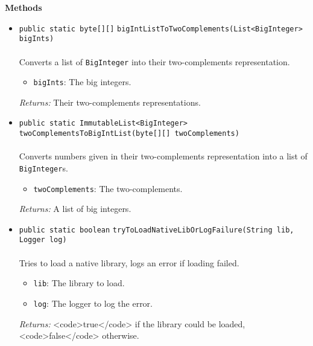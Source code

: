 \textbf{\sffamily Methods}
\begin{itemize}
\item \lstinline|public static byte[][]| \lstinline|bigIntListToTwoComplements|\lstinline|(List<BigInteger> bigInts)|\\ \\[-0.6em]
Converts a list of \lstinline|BigInteger| into their two-complements representation.
\begin{itemize}
\item \lstinline|bigInts|: The big integers.
\end{itemize}

\emph{Returns:} Their two-complements representations.

\item \lstinline|public static ImmutableList<BigInteger>| \lstinline|twoComplementsToBigIntList|\lstinline|(byte[][] twoComplements)|\\ \\[-0.6em]
Converts numbers given in their two-complements representation  into a list of
 \lstinline|BigInteger|s.
\begin{itemize}
\item \lstinline|twoComplements|: The two-complements.
\end{itemize}

\emph{Returns:} A list of big integers.

\item \lstinline|public static boolean| \lstinline|tryToLoadNativeLibOrLogFailure|\lstinline|(String lib, Logger log)|\\ \\[-0.6em]
Tries to load a native library, logs an error if loading failed.
\begin{itemize}
\item \lstinline|lib|: The library to load.
\item \lstinline|log|: The logger to log the error.
\end{itemize}

\emph{Returns:} <code>true</code> if the library could be loaded, <code>false</code> otherwise.

\end{itemize}

